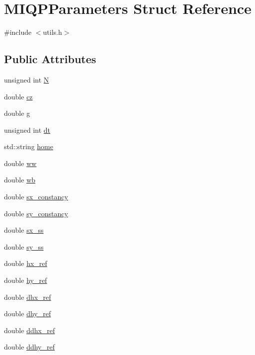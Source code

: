 \hypertarget{structMIQPParameters}{\section{\-M\-I\-Q\-P\-Parameters \-Struct \-Reference}
\label{structMIQPParameters}
}


{\ttfamily \#include $<$utils.\-h$>$}

\subsection*{\-Public \-Attributes}
\begin{DoxyCompactItemize}
\item 
unsigned int \hyperlink{structMIQPParameters_a7545bc29708292cbfca22b0446180f7c}{\-N}
\item 
double \hyperlink{structMIQPParameters_ab8158e2bf119d70c9856b6a277e3c42a}{cz}
\item 
double \hyperlink{structMIQPParameters_a31eca71d200b5b1468bd60b3266d0688}{g}
\item 
unsigned int \hyperlink{structMIQPParameters_ab4fca30503423e047dc55d27f0c9f3c9}{dt}
\item 
std\-::string \hyperlink{structMIQPParameters_a351843e2933021d2ed3abb00a9d001ff}{home}
\item 
double \hyperlink{structMIQPParameters_a7223a1cda1e4565d18729f1e7bba87e0}{ww}
\item 
double \hyperlink{structMIQPParameters_a6bc828e6060bfd69c3d6353a460de86b}{wb}
\item 
double \hyperlink{structMIQPParameters_ae7f08901a6a4bd6850cf232496d1c231}{sx\-\_\-constancy}
\item 
double \hyperlink{structMIQPParameters_a1dd5e07b3f05ddf30ecbe878caf4de38}{sy\-\_\-constancy}
\item 
double \hyperlink{structMIQPParameters_af8a016a12ecffd0751307c7d869472e9}{sx\-\_\-ss}
\item 
double \hyperlink{structMIQPParameters_a3c473019e93f8191f288edfe6999f4c1}{sy\-\_\-ss}
\item 
double \hyperlink{structMIQPParameters_a0346212871459ae33b79af6f9af49d5f}{hx\-\_\-ref}
\item 
double \hyperlink{structMIQPParameters_a09fe82db83af3f8ab0e891968daa7996}{hy\-\_\-ref}
\item 
double \hyperlink{structMIQPParameters_a97a8deb8aeda727c99dc501b4516a24e}{dhx\-\_\-ref}
\item 
double \hyperlink{structMIQPParameters_a816bb15b6417ac8387adbaac2f74e198}{dhy\-\_\-ref}
\item 
double \hyperlink{structMIQPParameters_a71dab92bc2eebbdf5e2d592c092e7f52}{ddhx\-\_\-ref}
\item 
double \hyperlink{structMIQPParameters_a996553605ecfefa749bde01bc4e7b2a9}{ddhy\-\_\-ref}
\end{DoxyCompactItemize}


